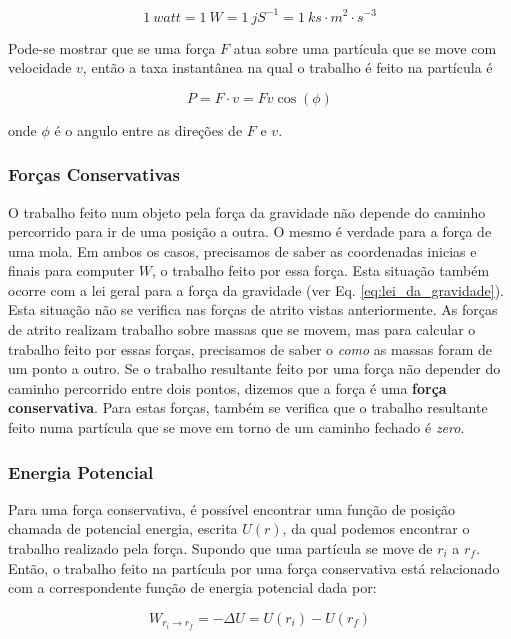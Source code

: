 \begin{equation}
    1\ watt = 1\ W = 1\ jS^{-1}=1\ ks\cdot m^2\cdot s^{-3}
\end{equation}

Pode-se mostrar que se uma força $F$ atua sobre uma partícula que se move com velocidade $v$, então a taxa instantânea na qual o trabalho é feito na partícula é

\begin{equation}
    P=F\cdot v=Fv\cos(\phi)
\end{equation}

onde $\phi$ é o angulo entre as direções de $F$ e $v$.

\subsubsection{Forças Conservativas}
O trabalho feito num objeto pela força da gravidade não depende do caminho percorrido para ir de uma posição a outra. O mesmo é verdade para a força de uma mola. Em ambos os casos, precisamos de saber as coordenadas inicias e finais para computer $W$, o trabalho feito por essa força.
Esta situação também ocorre com a lei geral para a força da gravidade (ver Eq. \ref{eq:lei_da_gravidade}).
Esta situação não se verifica nas forças de atrito vistas anteriormente. As forças de atrito realizam trabalho sobre massas que se movem, mas para calcular o trabalho feito por essas forças, precisamos de saber o \emph{como} as massas foram de um ponto a outro.
Se o trabalho resultante feito por uma força não depender do caminho percorrido entre dois pontos, dizemos que a força é uma \textbf{força conservativa}. Para estas forças, também se verifica que o trabalho resultante feito numa partícula que se move em torno de um caminho fechado é \emph{zero}.

\subsubsection{Energia Potencial}
Para uma força conservativa, é possível encontrar uma função de posição chamada de potencial energia, escrita $U(r)$, da qual podemos encontrar o trabalho realizado pela força.
Supondo que uma partícula se move de $r_i$ a $r_f$. Então, o trabalho feito na partícula por uma força conservativa está relacionado com a correspondente função de energia potencial dada por:

\begin{equation}\label{eq:trabalho-potencial}
    W_{r_i \to r_f}=-\Delta U=U(r_i)-U(r_f)
\end{equation}

